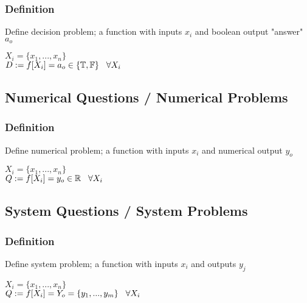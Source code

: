 \documentclass[11pt]{article}
\begin{document}
\subsubsection{Definition}
Define decision problem; a function with inputs $x_i$ and boolean output "answer" $a_o$
\begin{center}
$
X_i = \{x_1,...,x_n\}
$
\\ \vspace{2mm}
$
D := f \lbrack X_i \rbrack = a_{o} \in \{\mathbb{T}, \mathbb{F}\} \hspace{3mm} \forall X_i
$
\end{center}



\subsection{Numerical Questions / Numerical Problems}

\subsubsection{Definition}
Define numerical problem; a function with inputs $x_i$ and numerical output $y_o$
\begin{center}
$
X_i = \{x_1,...,x_n\}
$
\\ \vspace{2mm}
$
Q := f \lbrack X_i \rbrack = y_{o} \in \mathbb{R} \hspace{3mm} \forall X_i
$
\end{center}



\subsection{System Questions / System Problems}
\subsubsection{Definition}
Define system problem; a function with inputs $x_i$ and outputs $y_j$
\begin{center}
$
X_i = \{x_1,...,x_n\}
$
\\ \vspace{2mm}
$
Q := f \lbrack X_i \rbrack = Y_{o} = \{y_1,...,y_m\} \hspace{3mm} \forall X_i
$
\end{center}
\end{document}
